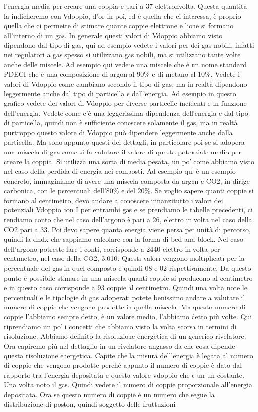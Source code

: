 {l'energia media per creare una coppia e pari a 37 elettronvolta. Questa quantità la indicheremo con Vdoppio, d'or in poi, ed è quella che ci interessa, è proprio quella che ci permette di stimare quante coppie elettrone e lione si formano all'interno di un gas. In generale questi valori di Vdoppio abbiamo visto dipendono dal tipo di gas, qui ad esempio vedete i valori per dei gas nobili, infatti nei regulatori a gas spesso si utilizzano gas nobili, ma si utilizzano tante volte anche delle miscele. Ad esempio qui vedete una miscele che è un nome standard PDECI che è una composizione di argon al 90\% e di metano al 10\%. Vedete i valori di Vdoppio come cambiano secondo il tipo di gas, ma in realtà dipendono leggermente anche dal tipo di particella e dall'energia. Ad esempio in questo grafico vedete dei valori di Vdoppio per diverse particelle incidenti e in funzione dell'energia. Vedete come c'è una leggerissima dipendenza dell'energia e dal tipo di particella, quindi non è sufficiente conoscere solamente il gas, ma in realtà purtroppo questo valore di Vdoppio può dipendere leggermente anche dalla particella. Ma sono appunto questi dei dettagli, in particolare poi se si adopera una miscela di gas come si fa valutare il valore di questo potenziale medio per creare la coppia. Si utilizza una sorta di media pesata, un po' come abbiamo visto nel caso della perdida di energia nei composti. Ad esempio qui è un esempio concreto, immaginiamo di avere una miscela composta da argon e CO2, in dirige carbonica, con le percentuali dell'80\% e del 20\%. Se voglio sapere quanti coppie si formano al centimetro, devo andare a conoscere innanzitutto i valori dei potenziali Vdoppio con I per entrambi gas e se prendiamo le tabelle precedenti, ci rendiamo conto che nel caso dell'argono è pari a 26, elettro in volta nel caso della CO2 pari a 33. Poi devo sapere quanta energia viene persa per unità di percorso, quindi la dndx che sappiamo calcolare con la forma di bed and block. Nel caso dell'argono potreste fare i conti, corrisponde a 2440 elettro in volta per centimetro, nel caso della CO2, 3.010. Questi valori vengono moltiplicati per la percentuale del gas in quel composto e quindi 08 e 02 rispettivamente. Da questo punto è possibile stimare in una miscela quanti coppie si producono al centimetro e in questo caso corrisponde a 93 coppie al centimetro. Quindi una volta note le percentuali e le tipologie di gas adoperati potete benissimo andare a valutare il numero di coppie che vengono prodotte in quella miscela. Ma questo numero di coppie l'abbiamo sempre detto, è un valore medio, l'abbiamo detto più volte. Qui riprendiamo un po' i concetti che abbiamo visto la volta scorsa in termini di risoluzione. Abbiamo definito la risoluzione energetica di un generico rivelatore. Ora capiremo più nel dettaglio in un rivelatore angasso da che cosa dipende questa risoluzione energetica. Capite che la misura dell'energia è legata al numero di coppie che vengono prodotte perché appunto il numero di coppie è dato dal rapporto tra l'energia depositata e questo valore vdoppio che è un un costante. Una volta noto il gas. Quindi vedete il numero di coppie proporzionale all'energia depositata. Ora se questo numero di coppie è un numero che segue la distribuzione di poston, quindi soggetto delle fruttuzioni }
